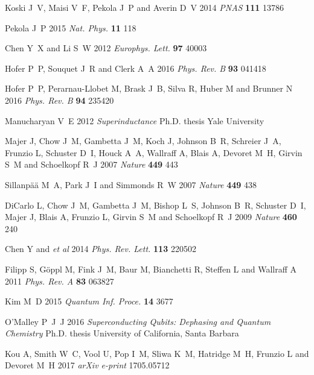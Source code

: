 \documentclass[12pt]{iopart}
\begin{document}
\begin{thebibliography}{10}
Koski J~V, Maisi V~F, Pekola J~P and Averin D~V 2014 {\em PNAS\/} {\bf 111}
  13786

Pekola J~P 2015 {\em Nat. Phys.\/} {\bf 11} 118

Chen Y~X and Li S~W 2012 {\em Europhys. Lett.\/} {\bf 97} 40003

Hofer P~P, Souquet J~R and Clerk A~A 2016 {\em Phys. Rev. B\/} {\bf 93} 041418

Hofer P~P, Perarnau-Llobet M, Brask J~B, Silva R, Huber M and Brunner N 2016
  {\em Phys. Rev. B\/} {\bf 94} 235420

Manucharyan V~E 2012 {\em Superinductance\/} Ph.D. thesis Yale University

Majer J, Chow J~M, Gambetta J~M, Koch J, Johnson B~R, Schreier J~A, Frunzio L,
  Schuster D~I, Houck A~A, Wallraff A, Blais A, Devoret M~H, Girvin S~M and
  Schoelkopf R~J 2007 {\em Nature\/} {\bf 449} 443

Sillanp{\"a}{\"a} M~A, Park J~I and Simmonds R~W 2007 {\em Nature\/} {\bf 449}
  438

DiCarlo L, Chow J~M, Gambetta J~M, Bishop L~S, Johnson B~R, Schuster D~I, Majer
  J, Blais A, Frunzio L, Girvin S~M and Schoelkopf R~J 2009 {\em Nature\/} {\bf
  460} 240

Chen Y and \textit{et al} 2014 {\em Phys. Rev. Lett.\/} {\bf 113} 220502

Filipp S, G\"oppl M, Fink J~M, Baur M, Bianchetti R, Steffen L and Wallraff A
  2011 {\em Phys. Rev. A\/} {\bf 83} 063827

Kim M~D 2015 {\em Quantum Inf. Proce.\/} {\bf 14} 3677

O'Malley P~J~J 2016 {\em Superconducting Qubits: Dephasing and Quantum
  Chemistry\/} Ph.D. thesis University of California, Santa Barbara

Kou A, Smith W~C, Vool U, Pop I~M, Sliwa K~M, Hatridge M~H, Frunzio L and
  Devoret M~H 2017 {\em arXiv e-print\/}  1705.05712

\end{thebibliography}
\end{document}
